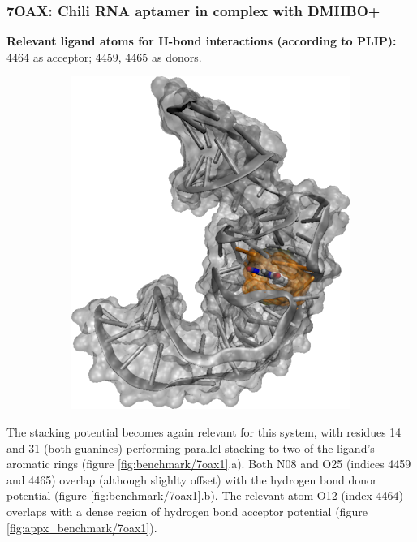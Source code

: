     \subsubsection{7OAX: Chili RNA aptamer in complex with DMHBO+}
      \textbf{Relevant ligand atoms for H-bond interactions (according to PLIP):} 4464 as acceptor; 4459, 4465 as donors.

      \begin{figure}[H] \centering
        \begin{subfigure}[c]{0.3\textwidth} \centering
          \includegraphics[width=1\textwidth]{figures/results/ps_rna/5bjo.png}
        \end{subfigure}
        \begin{subfigure}[c]{0.3\textwidth} \centering
        \end{subfigure}
      \end{figure}

      The stacking potential becomes again relevant for this system, with residues 14 and 31 (both guanines) performing parallel stacking to two of the ligand's aromatic rings (figure \ref{fig:benchmark/7oax1}.a). Both N08 and O25 (indices 4459 and 4465) overlap (although slighlty offset) with the hydrogen bond donor potential (figure \ref{fig:benchmark/7oax1}.b). The relevant atom O12 (index 4464) overlaps with a dense region of hydrogen bond acceptor potential (figure \ref{fig:appx_benchmark/7oax1}).

